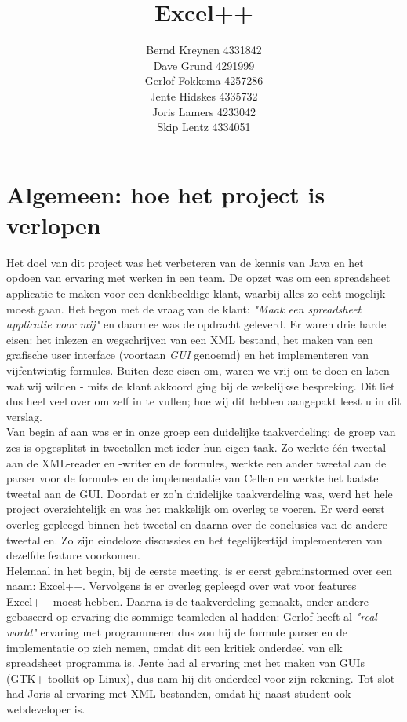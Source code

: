 \documentclass[a4paper,11pt]{article}
\title{Excel++}
\author{Bernd Kreynen 4331842\\
		Dave Grund 4291999\\
		Gerlof Fokkema 4257286\\
		Jente Hidskes 4335732\\
		Joris Lamers 4233042\\
		Skip Lentz 4334051\\
	   }
\begin{document}
\begin{titlepage}
\maketitle
\thispagestyle{empty} %
\end{titlepage}

\setcounter{tocdepth}{2}
\tableofcontents

\newpage\section{Algemeen: hoe het project is verlopen}
Het doel van dit project was het verbeteren van de kennis van Java en het opdoen van ervaring met werken in een team. De opzet was om een spreadsheet applicatie te maken voor een denkbeeldige klant, waarbij alles zo echt mogelijk moest gaan. Het begon met de vraag van de klant: \textit{"Maak een spreadsheet applicatie voor mij"} en daarmee was de opdracht geleverd. Er waren drie harde eisen: het inlezen en wegschrijven van een XML bestand, het maken van een grafische user interface (voortaan \textit{GUI}  genoemd) en het implementeren van vijfentwintig formules. Buiten deze eisen om, waren we vrij om te doen en laten wat wij wilden - mits de klant akkoord ging bij de wekelijkse bespreking. Dit liet dus heel veel over om zelf in te vullen; hoe wij dit hebben aangepakt leest u in dit verslag.\\

Van begin af aan was er in onze groep een duidelijke taakverdeling: de groep van zes is opgesplitst in tweetallen met ieder hun eigen taak. Zo werkte één tweetal aan de XML-reader en -writer en de formules, werkte een ander tweetal aan de parser voor de formules en de implementatie van Cellen en werkte het laatste tweetal aan de GUI. Doordat er zo’n duidelijke taakverdeling was, werd het hele project overzichtelijk en was het makkelijk om overleg te voeren. Er werd eerst overleg gepleegd binnen het tweetal en daarna over de conclusies van de andere tweetallen. Zo zijn eindeloze discussies en het tegelijkertijd implementeren van dezelfde feature voorkomen.\\

Helemaal in het begin, bij de eerste meeting, is er eerst gebrainstormed over een naam: Excel++. Vervolgens is er overleg gepleegd over wat voor features Excel++ moest hebben. Daarna is de taakverdeling gemaakt, onder andere gebaseerd op ervaring die sommige teamleden al hadden: Gerlof heeft al \textit{"real world"} ervaring met programmeren dus zou hij de formule parser en de implementatie op zich nemen, omdat dit een kritiek onderdeel van elk spreadsheet programma is. Jente had al ervaring met het maken van GUIs (GTK+ toolkit op Linux), dus nam hij dit onderdeel voor zijn rekening. Tot slot had Joris al ervaring met XML bestanden, omdat hij naast student ook webdeveloper is.\\
\end{document}
